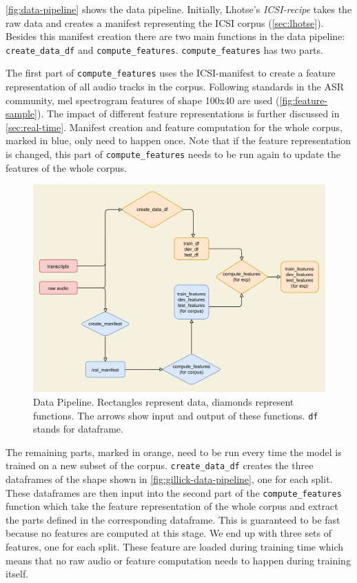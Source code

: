 \documentclass[bsc,frontabs,parskip,deptreport]{infthesis}
\begin{document}
\autoref{fig:data-pipeline} shows the data pipeline.
Initially, Lhotse's \textit{ICSI-recipe} takes the raw data and creates a manifest representing the ICSI corpus (\autoref{sec:lhotse}).
Besides this manifest creation there are two main functions in the data pipeline: \verb|create_data_df| and \verb|compute_features|. 
\verb|compute_features| has two parts.

The first part of \verb|compute_features| uses the ICSI-manifest to create a feature representation of all audio tracks in the corpus. Following standards in the ASR community, mel spectrogram features of shape 100x40 are used (\autoref{fig:feature-sample}). The impact of different feature representations is further discussed in \autoref{sec:real-time}. 
Manifest creation and feature computation for the whole corpus, marked in blue, only need to happen once.
Note that if the feature representation is changed, this part of \verb|compute_features| needs to be run again to update the features of the whole corpus.


\begin{figure}[h!]
    \centering
    \includegraphics[width=15cm]{imgs/diagrams/Pipeline.drawio.png}
    \caption{Data Pipeline. Rectangles represent data, diamonds represent functions. The arrows show input and output of these functions. \texttt{df} stands for dataframe.}
    \label{fig:data-pipeline}
\end{figure}

The remaining parts, marked in orange, need to be run every time the model is trained on a new subset of the corpus.
\verb|create_data_df| creates the three dataframes of the shape shown in \autoref{fig:gillick-data-pipeline}, one for each split.
These dataframes are then input into the second part of the \verb|compute_features| function which take the feature representation of the whole corpus and extract the parts defined in the corresponding dataframe. This is guaranteed to be fast because no features are computed at this stage.
We end up with three sets of features, one for each split. 
These feature are loaded during training time which means that no raw audio or feature computation needs to happen during training itself.
\end{document}
